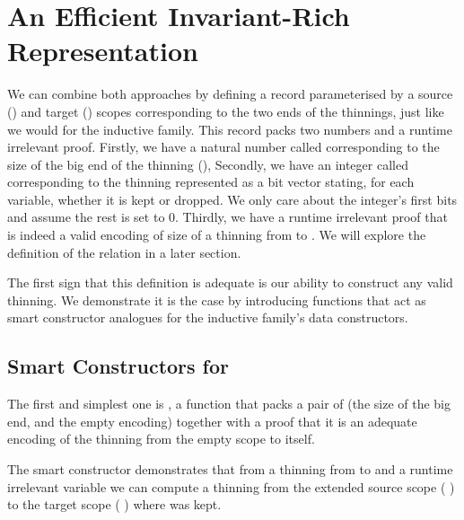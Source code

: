 
\section{An Efficient Invariant-Rich Representation}\label{sec:efficient}

We can combine both approaches by defining a record parameterised by a source
() and target () scopes corresponding to the two
ends of the thinnings, just like we would for the inductive family. This record
packs two numbers and a runtime irrelevant proof.
%
Firstly, we have a natural number called  corresponding
to the size of the big end of the thinning (),
%
Secondly, we have an integer called  corresponding to
the thinning represented as a bit vector stating, for each variable, whether
it is kept or dropped. We only care about the integer's 
first bits and assume the rest is set to 0.
%
Thirdly, we have a runtime irrelevant proof  that
 is indeed a valid encoding of size 
of a thinning from  to . We will explore the
definition of the relation  in a later section.


The first sign that this definition is adequate is our ability to construct
any valid thinning. We demonstrate it is the case by introducing functions
that act as smart constructor analogues for the inductive family's data
constructors.

\subsection{Smart Constructors for }

The first and simplest one is , a function that packs a pair of
 (the size of the big end, and the empty encoding) together with a proof
that it is an adequate encoding of the thinning from the empty scope to itself.


The  smart constructor demonstrates that from a thinning from
 to  and a runtime irrelevant variable 
we can compute a thinning from the extended source scope
( \IdrisData{:<} ) to the target scope
( \IdrisData{:<} ) where  was kept.

